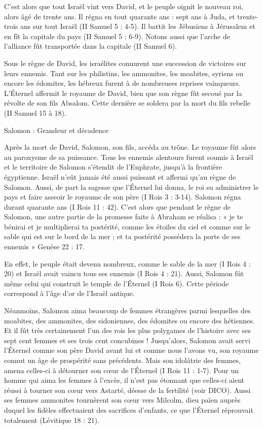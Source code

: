 C'est alors que tout Israël vint vers David, et le peuple oignit le nouveau roi, alors âgé de trente ans. Il régna en tout quarante ans : sept ans à Juda, et trente-trois ans sur tout Israël (II Samuel 5 : 4-5). Il battit les Jébusiens à Jérusalem et en fît la capitale du pays (II Samuel 5 : 6-9). Notons aussi que l'arche de l'alliance fût transportée dans la capitale (II Samuel 6).

Sous le règne de David, les israélites connurent une succession de victoires sur leurs ennemis. Tant sur les philistins, les ammonites, les moabites, syriens ou encore les édomites, les hébreux furent à de nombreuses reprises vainqueurs. L’Éternel affermit le royaume de David, bien que son règne fût secoué par la révolte de son fils Absalom. Cette dernière se soldera par la mort du fils rebelle (II Samuel 15 à 18). 

Salomon : Grandeur et décadence

Après la mort de David, Salomon, son fils, accéda au trône. Le royaume fût alors au paroxysme de sa puissance. Tous les ennemis alentours furent soumis à Israël et le territoire de Salomon s’étendit de l'Euphrate, jusqu'à la frontière égyptienne. Israël n'eût jamais été aussi puissant et affermi qu'au règne de Salomon. Aussi, de part la sagesse que l’Éternel lui donna, le roi su administrer le pays et faire asseoir le royaume de son père (I Rois 3 : 3-14). Salomon régna durant quarante ans (I Rois 11 : 42).
C'est alors que pendant le règne de Salomon, une autre partie de la promesse faite à Abraham se réalisa : « je te bénirai et je multiplierai ta postérité, comme les étoiles du ciel et comme sur le sable qui est sur le bord de la mer ; et ta postérité possédera la porte de ses ennemis » Genèse 22 : 17.

En effet, le peuple était devenu nombreux, comme le sable de la mer (I Rois 4 : 20) et Israël avait vaincu tous ses ennemis (I Rois 4 : 21). Aussi, Salomon fût même celui qui construit le temple de l’Éternel (I Rois 6). Cette période correspond à l'âge d'or de l'Israël antique.

Néanmoins, Salomon aima beaucoup de femmes étrangères parmi lesquelles des moabites, des ammonites, des sidoniennes, des édomites ou encore des hétiennes. Et il fût très certainement l'un des rois les plus polygames de l'histoire avec ses sept cent femmes et ses trois cent concubines ! Jusqu'alors, Salomon avait servi l’Éternel comme son père David avant lui et comme nous l'avons vu, son royaume connut un âge de prospérité sans précédents. Mais son idolâtrie des femmes, amena celles-ci à détourner son cœur de l’Éternel (I Rois 11 : 1-7). Pour un homme qui aima les femmes à l'excès, il n'est pas étonnant que celles-ci aient réussi à tourner son cœur vers Astarté, déesse de la fertilité (voir DICO). Aussi ses femmes ammonites tournèrent son cœur vers Milcolm, dieu païen auprès duquel les fidèles effectuaient des sacrifices d'enfants, ce que l’Éternel réprouvait totalement (Lévitique 18 : 21).

